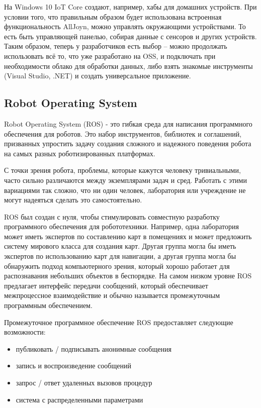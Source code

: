 \documentclass[a4paper,12pt]{article}
\begin{document}
На Windows 10 IoT Core создают, например, хабы для домашних устройств. При условии того, что правильным образом будет использована встроенная функциональность AllJoyn, можно управлять окружающими устройствами. То есть быть управляющей панелью, собирая данные с сенсоров и других устройств. 
Таким образом, теперь у разработчиков есть выбор – можно продолжать использовать всё то, что уже разработано на OSS, и подключать при необходимости облако для обработки данных, либо взять знакомые инструменты (Visual Studio, .NET) и создать универсальное приложение. 

\subsection{Robot Operating System}
Robot Operating System (ROS) - это гибкая среда для написания программного обеспечения для роботов. Это набор инструментов, библиотек и соглашений, призванных упростить задачу создания сложного и надежного поведения робота на самых разных роботизированных платформах.

С точки зрения робота, проблемы, которые кажутся человеку тривиальными, часто сильно различаются между экземплярами задач и сред. Работать с этими вариациями так сложно, что ни один человек, лаборатория или учреждение не могут надеяться сделать это самостоятельно.

ROS был создан с нуля, чтобы стимулировать совместную разработку программного обеспечения для робототехники. Например, одна лаборатория может иметь экспертов по составлению карт в помещениях и может предложить систему мирового класса для создания карт. Другая группа могла бы иметь экспертов по использованию карт для навигации, а другая группа могла бы обнаружить подход компьютерного зрения, который хорошо работает для распознавания небольших объектов в беспорядке. 
На самом низком уровне ROS предлагает интерфейс передачи сообщений, который обеспечивает межпроцессное взаимодействие и обычно называется промежуточным программным обеспечением.

Промежуточное программное обеспечение ROS предоставляет следующие возможности:
\begin{itemize}
    \item публиковать / подписывать анонимные сообщения
    \item запись и воспроизведение сообщений
    \item запрос / ответ удаленных вызовов процедур
    \item система с распределенными параметрами
\end{itemize}
\end{document}

